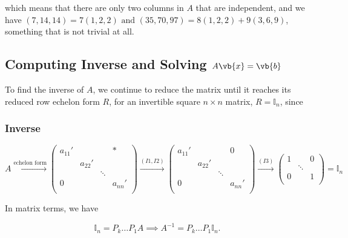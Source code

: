 \documentclass[a4paper,12pt]{report}
\begin{document}
which means that there are only two columns in \(A\) that are independent, and we have \((7,14,14) = 7(1,2,2) \text { and } (35,70,97) = 8(1,2,2) + 9(3,6,9)\), something that is not trivial at all.  

\subsection{Computing Inverse and Solving \(A\vb{x} = \vb{b} \)}

To find the inverse of \(A\), we continue to reduce the matrix until it reaches its reduced row echelon form \(R\), for an invertible square \(n \times n\) matrix, \(R = \mathbb{I}_{n} \), since

\subsubsection{Inverse}

\begin{equation}
    A \xrightarrow{\text{echelon form} } \begin{pmatrix}
        a_{11}'  &  &  & * \\
         & a_{22}'  &  &   \\
         &  & \ddots  &   \\
        0 &  &  & a_{nn}'   \\
    \end{pmatrix} \xrightarrow{(I1,I2)}  \begin{pmatrix}
        a_{11}'  &  &  & 0 \\
         & a_{22}'  &  &   \\
         &  & \ddots  &   \\
        0 &  &  & a_{nn}'   \\
    \end{pmatrix} \xrightarrow{(I3)} \begin{pmatrix}
        1 &  & 0  \\
         & \ddots  &   \\
        0 &  & 1 \\
    \end{pmatrix} = \mathbb{I}_{n} 
\end{equation}

In matrix terms, we have

\begin{equation}
    \mathbb{I}_{n} = P_{k} \ldots P_{1}A \implies A^{-1} = P_{k} \ldots P_{1} \mathbb{I}_{n}.    
\end{equation}
\end{document}
